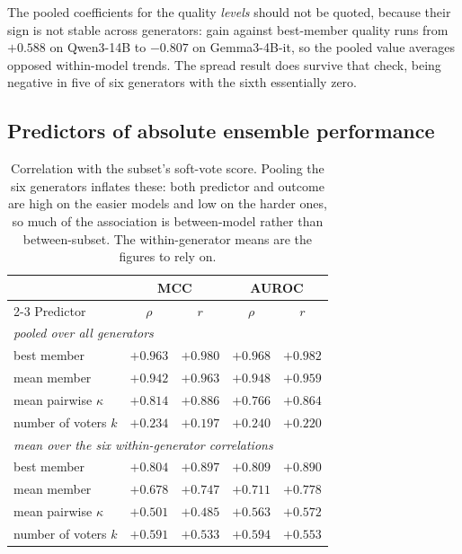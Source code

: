 The pooled coefficients for the quality \emph{levels} should not be quoted, because
their sign is not stable across generators: gain against best-member quality runs from
$+0.588$ on Qwen3-14B to $-0.807$ on Gemma3-4B-it, so the pooled value averages opposed
within-model trends. The spread result does survive that check, being negative in five of
six generators with the sixth essentially zero.

\subsection{Predictors of absolute ensemble performance}

\begin{table}[h]\centering\footnotesize
  \caption{Correlation with the subset's soft-vote score. Pooling the six generators
  inflates these: both predictor and outcome are high on the easier models and low on
  the harder ones, so much of the association is between-model rather than
  between-subset. The within-generator means are the figures to rely on.}
  \begin{tabular}{l c c c c}
    \hline
    & \multicolumn{2}{c}{MCC} & \multicolumn{2}{c}{AUROC} \\
    \cline{2-3}\cline{4-5}
    Predictor & $\rho$ & $r$ & $\rho$ & $r$ \\
    \hline
    \multicolumn{5}{l}{\itshape pooled over all generators} \\
    best member & $+0.963$ & $+0.980$ & $+0.968$ & $+0.982$ \\
    mean member & $+0.942$ & $+0.963$ & $+0.948$ & $+0.959$ \\
    mean pairwise $\kappa$ & $+0.814$ & $+0.886$ & $+0.766$ & $+0.864$ \\
    number of voters $k$ & $+0.234$ & $+0.197$ & $+0.240$ & $+0.220$ \\
    \hline
    \multicolumn{5}{l}{\itshape mean over the six within-generator correlations} \\
    best member & $+0.804$ & $+0.897$ & $+0.809$ & $+0.890$ \\
    mean member & $+0.678$ & $+0.747$ & $+0.711$ & $+0.778$ \\
    mean pairwise $\kappa$ & $+0.501$ & $+0.485$ & $+0.563$ & $+0.572$ \\
    number of voters $k$ & $+0.591$ & $+0.533$ & $+0.594$ & $+0.553$ \\
    \hline\end{tabular}\end{table}

